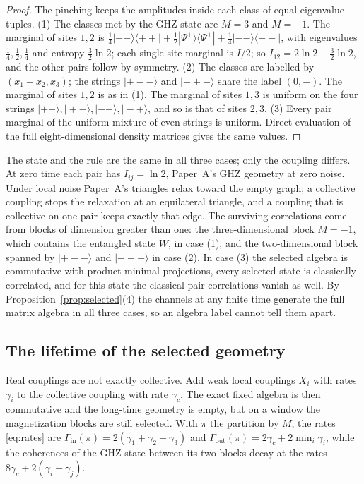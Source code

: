\documentclass[12pt,a4paper]{article}
\newcommand{\Gin}{\Gamma_{\mathrm{in}}}
\newcommand{\Gout}{\Gamma_{\mathrm{out}}}
\newcommand{\ket}[1]{|#1\rangle}
\newcommand{\proj}[1]{|#1\rangle\!\langle #1|}
\begin{document}
\begin{proof}
The pinching keeps the amplitudes inside each class of equal eigenvalue tuples. (1) The classes met by the GHZ state are $M=3$ and $M=-1$. The marginal of sites $1,2$ is $\frac14\proj{++}+\frac12\proj{\Psi^+}+\frac14\proj{--}$, with eigenvalues $\frac14,\frac12,\frac14$ and entropy $\frac32\ln2$; each single-site marginal is $I/2$; so $I_{12}=2\ln2-\frac32\ln2$, and the other pairs follow by symmetry. (2) The classes are labelled by $(x_1+x_2,x_3)$; the strings $\ket{+--}$ and $\ket{-+-}$ share the label $(0,-)$. The marginal of sites $1,2$ is as in (1). The marginal of sites $1,3$ is uniform on the four strings $\ket{++},\ket{+-},\ket{--},\ket{-+}$, and so is that of sites $2,3$. (3) Every pair marginal of the uniform mixture of even strings is uniform. Direct evaluation of the full eight-dimensional density matrices gives the same values.
\end{proof}

The state and the rule are the same in all three cases; only the coupling differs. At zero time each pair has $I_{ij}=\ln2$, Paper~A's GHZ geometry at zero noise. Under local noise Paper~A's triangles relax toward the empty graph; a collective coupling stops the relaxation at an equilateral triangle, and a coupling that is collective on one pair keeps exactly that edge. The surviving correlations come from blocks of dimension greater than one: the three-dimensional block $M=-1$, which contains the entangled state $\tilde W$, in case (1), and the two-dimensional block spanned by $\ket{+--}$ and $\ket{-+-}$ in case (2). In case (3) the selected algebra is commutative with product minimal projections, every selected state is classically correlated, and for this state the classical pair correlations vanish as well. By Proposition~\ref{prop:selected}(4) the channels at any finite time generate the full matrix algebra in all three cases, so an algebra label cannot tell them apart.

\subsection{The lifetime of the selected geometry}

Real couplings are not exactly collective. Add weak local couplings $X_i$ with rates $\gamma_i$ to the collective coupling with rate $\gamma_c$. The exact fixed algebra is then commutative and the long-time geometry is empty, but on a window the magnetization blocks are still selected. With $\pi$ the partition by $M$, the rates \eqref{eq:rates} are $\Gin(\pi)=2(\gamma_1+\gamma_2+\gamma_3)$ and $\Gout(\pi)=2\gamma_c+2\min_i\gamma_i$, while the coherences of the GHZ state between its two blocks decay at the rates $8\gamma_c+2(\gamma_i+\gamma_j)$.
\end{document}
